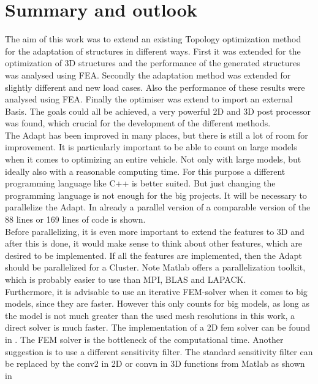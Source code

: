\chapter{Summary and outlook}

The aim of this work was
to extend an existing Topology optimization method for
the adaptation of structures in different
ways. First it was extended for the optimization of 3D structures
and the performance of the generated structures was analysed using FEA. Secondly the adaptation
method was extended for slightly different and new load cases.
Also the performance of these results were analysed using FEA.
Finally the optimiser was extend to import an external Basis.
The goals could all be achieved,
a very powerful 2D and 3D post processor was found, which crucial for
the development of the different methods.\\

The Adapt has been improved in many places, but there is still a lot of room for improvement. It is particularly important to be able to count on large models when it comes to optimizing an entire vehicle. Not only with large models, but ideally also with a reasonable computing time. For this purpose a different programming language like C++ is better suited. But just changing the programming language is not enough for the big projects. It will be necessary
to parallelize the Adapt.
In \cite{Aage.2015} already a parallel version of a comparable version of the 88 lines or 169 lines of code is shown. \\

Before parallelizing, it is even more important to extend the features to 3D and after this is done, it would make sense to  think about other features, which
are desired to be implemented.
If all the features are implemented, then
the Adapt should be parallelized for a Cluster. Note Matlab offers a parallelization
toolkit, which is probably easier to use than MPI, BLAS and LAPACK.\\

Furthermore, it is advisable to use an iterative FEM-solver when it comes
to big models, since they are faster. However this only counts
for big models, as long as the model is not much greater than
the used
mesh resolutions in this work, a direct solver is much faster. The
implementation of a 2D fem solver can be found in \cite{Amir.2014}. The
FEM solver is the bottleneck of the computational time. Another
suggestion is to use a different sensitivity filter. The standard
sensitivity filter can be replaced by the conv2 in 2D or convn in 3D
functions from Matlab as shown in \cite{Andreassen.2011}